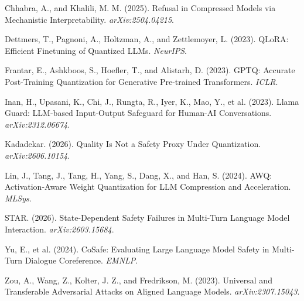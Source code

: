 \documentclass[11pt]{article}
\begin{document}
Chhabra, A., and Khalili, M. M. (2025). Refusal in Compressed Models via
Mechanistic Interpretability. \textit{arXiv:2504.04215}.

Dettmers, T., Pagnoni, A., Holtzman, A., and Zettlemoyer, L. (2023). QLoRA:
Efficient Finetuning of Quantized LLMs. \textit{NeurIPS}.

Frantar, E., Ashkboos, S., Hoefler, T., and Alistarh, D. (2023). GPTQ: Accurate
Post-Training Quantization for Generative Pre-trained Transformers. \textit{ICLR}.

Inan, H., Upasani, K., Chi, J., Rungta, R., Iyer, K., Mao, Y., et al. (2023).
Llama Guard: LLM-based Input-Output Safeguard for Human-AI Conversations.
\textit{arXiv:2312.06674}.

Kadadekar. (2026). Quality Is Not a Safety Proxy Under Quantization.
\textit{arXiv:2606.10154}.

Lin, J., Tang, J., Tang, H., Yang, S., Dang, X., and Han, S. (2024). AWQ:
Activation-Aware Weight Quantization for LLM Compression and Acceleration.
\textit{MLSys}.

STAR. (2026). State-Dependent Safety Failures in Multi-Turn Language Model
Interaction. \textit{arXiv:2603.15684}.

Yu, E., et al. (2024). CoSafe: Evaluating Large Language Model Safety in
Multi-Turn Dialogue Coreference. \textit{EMNLP}.

Zou, A., Wang, Z., Kolter, J. Z., and Fredrikson, M. (2023). Universal and
Transferable Adversarial Attacks on Aligned Language Models.
\textit{arXiv:2307.15043}.
\end{document}
